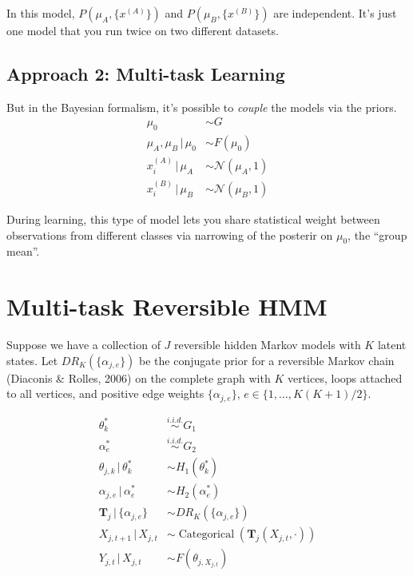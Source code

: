 \documentclass[twocolumn,floatfix,nofootinbib,aps]{revtex4-1}
\begin{document}
In this model, $P(\mu_A, \{x^{(A)}\})$ and $P(\mu_B, \{x^{(B)}\})$ are independent. It's just one model that you run twice on two different datasets.

\subsection{Approach 2: Multi-task Learning}

But in the Bayesian formalism, it's possible to \emph{couple} the models via the priors.
\begin{align*}
\mu_0 & \sim G \\
\mu_A, \mu_B \,|\, \mu_0 & \sim F(\mu_0) \\
x^{(A)}_i \,|\, \mu_A & \sim \mathcal{N}(\mu_A, 1) \\
x^{(B)}_i \,|\, \mu_B & \sim \mathcal{N}(\mu_B, 1)
\end{align*}

During learning, this type of model lets you share statistical weight between observations from different classes via narrowing of the posterir on $\mu_0$, the ``group mean''.

\section{Multi-task Reversible HMM}

Suppose we have a collection of $J$ reversible hidden Markov models with $K$ latent states. Let $DR_K(\{\alpha_{j, e}\})$ be the conjugate prior for a reversible Markov chain (Diaconis \& Rolles, 2006) on the complete graph with $K$ vertices, loops attached to all vertices, and positive edge weights $\{\alpha_{j, e}\}$, $e \in \{1, \ldots, K(K+1)/2\}$.

\begin{align*}
\theta^*_k & \overset{i.i.d.}{\sim} G_1 \\
\alpha^*_e & \overset{i.i.d.}{\sim} G_2 \\
\theta_{j,k} \,|\, \theta^*_k & \sim  H_1(\theta^*_k) \\
\alpha_{j,e} \,|\, \alpha^*_e & \sim H_2(\alpha^*_e) \\
\mathbf{T}_j \,|\, \{\alpha_{j, e}\} & \sim DR_K(\{\alpha_{j, e}\}) \\
X_{j, t+1} \,|\, X_{j, t} & \sim \operatorname{Categorical}(\mathbf{T}_{j}(X_{j,t}, \cdot)) \\
Y_{j,t} \,|\, X_{j,t} & \sim F(\theta_{j, X_{j,t}})
\end{align*}
\end{document}

